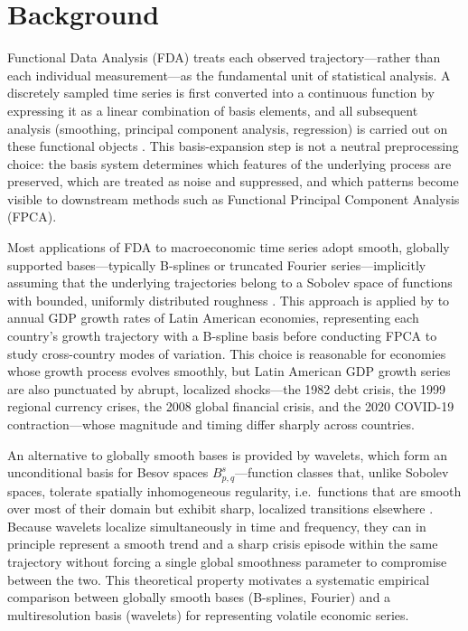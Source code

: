 \section{Background}
\label{sec:background}

Functional Data Analysis (FDA) treats each observed trajectory---rather than
each individual measurement---as the fundamental unit of statistical
analysis. A discretely sampled time series is first converted into a
continuous function by expressing it as a linear combination of basis
elements, and all subsequent analysis (smoothing, principal component
analysis, regression) is carried out on these functional objects
\cite{ramsay2005}. This basis-expansion step is not a neutral
preprocessing choice: the basis system determines which features of the
underlying process are preserved, which are treated as noise and
suppressed, and which patterns become visible to downstream methods such as
Functional Principal Component Analysis (FPCA).

Most applications of FDA to macroeconomic time series adopt smooth,
globally supported bases---typically B-splines or truncated Fourier
series---implicitly assuming that the underlying trajectories belong to a
Sobolev space of functions with bounded, uniformly distributed roughness
\cite{ramsay2005}. This approach is applied by \cite{padilla2020} to
annual GDP growth rates of Latin American economies, representing each country's
growth trajectory with a B-spline basis before conducting FPCA to study
cross-country modes of variation. This choice is reasonable for economies
whose growth process evolves smoothly, but Latin American GDP growth
series are also punctuated by abrupt, localized shocks---the 1982 debt
crisis, the 1999 regional currency crises, the 2008 global financial
crisis, and the 2020 COVID-19 contraction---whose magnitude and timing
differ sharply across countries.

An alternative to globally smooth bases is provided by wavelets, which
form an unconditional basis for Besov spaces
$B^{s}_{p,q}$---function classes that, unlike Sobolev spaces, tolerate
spatially inhomogeneous regularity, i.e.\ functions that are smooth over
most of their domain but exhibit sharp, localized transitions elsewhere
\cite{donoho1998}. Because wavelets localize simultaneously in time and
frequency, they can in principle represent a smooth trend and a sharp
crisis episode within the same trajectory without forcing a single
global smoothness parameter to compromise between the two. This
theoretical property motivates a systematic empirical comparison between
globally smooth bases (B-splines, Fourier) and a multiresolution basis
(wavelets) for representing volatile economic series.

